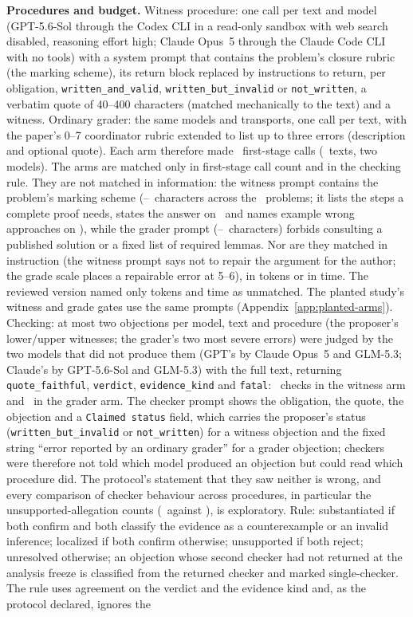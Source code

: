 \textbf{Procedures and budget.} Witness procedure: one call per text and model (GPT-5.6-Sol through the Codex CLI in a read-only sandbox with web search disabled, reasoning effort high; Claude Opus~5 through the Claude Code CLI with no tools) with a system prompt that contains the problem's closure rubric (the marking scheme), its return block replaced by instructions to return, per obligation, \texttt{written\_and\_valid}, \texttt{written\_but\_invalid} or \texttt{not\_written}, a verbatim quote of 40--400 characters (matched mechanically to the text) and a witness. Ordinary grader: the same models and transports, one call per text, with the paper's 0--7 coordinator rubric extended to list up to three errors (description and optional quote). Each arm therefore made \WITNESSFIRSTCALLS\ first-stage calls (\WITNESSN\ texts, two models). The arms are matched only in first-stage call count and in the checking rule. They are not matched in information: the witness prompt contains the problem's marking scheme (\CRAppNatWitnessCharsMin--\CRAppNatWitnessCharsMax\ characters across the \CRAppNatProblems\ problems; it lists the steps a complete proof needs, states the answer on \CRAppNatAnswerProbs\ and names example wrong approaches on \CRAppNatWrongProbs), while the grader prompt (\CRAppNatGraderCharsMin--\CRAppNatGraderCharsMax\ characters) forbids consulting a published solution or a fixed list of required lemmas. Nor are they matched in instruction (the witness prompt says not to repair the argument for the author; the grade scale places a repairable error at 5--6), in tokens or in time. The reviewed version named only tokens and time as unmatched. The planted study's witness and grade gates use the same prompts (Appendix~\ref{app:planted-arms}). Checking: at most two objections per model, text and procedure (the proposer's lower/upper witnesses; the grader's two most severe errors) were judged by the two models that did not produce them (GPT's by Claude Opus~5 and GLM-5.3; Claude's by GPT-5.6-Sol and GLM-5.3) with the full text, returning \texttt{quote\_faithful}, \texttt{verdict}, \texttt{evidence\_kind} and \texttt{fatal}: \WITNESSCHECKSW\ checks in the witness arm and \WITNESSCHECKSG\ in the grader arm. The checker prompt shows the obligation, the quote, the objection and a \texttt{Claimed status} field, which carries the proposer's status (\texttt{written\_but\_invalid} or \texttt{not\_written}) for a witness objection and the fixed string ``error reported by an ordinary grader'' for a grader objection; checkers were therefore not told which model produced an objection but could read which procedure did. The protocol's statement that they saw neither is wrong, and every comparison of checker behaviour across procedures, in particular the unsupported-allegation counts (\WITNESSREJECTED\ against \GRADERREJECTED), is exploratory. Rule: substantiated if both confirm and both classify the evidence as a counterexample or an invalid inference; localized if both confirm otherwise; unsupported if both reject; unresolved otherwise; an objection whose second checker had not returned at the analysis freeze is classified from the returned checker and marked single-checker. The rule uses agreement on the verdict and the evidence kind and, as the protocol declared, ignores the 